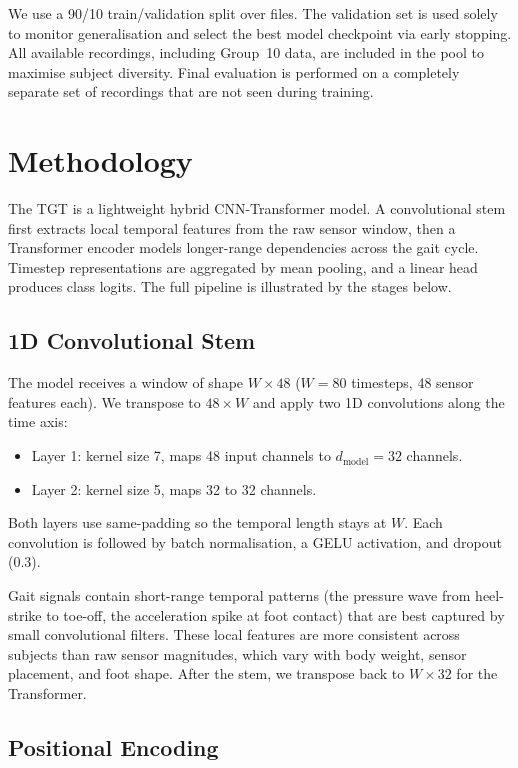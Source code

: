 \documentclass[11pt,a4paper,twocolumn]{article}
\begin{document}
We use a 90/10 train/validation split over files. The validation set is used solely to monitor generalisation and select the best model checkpoint via early stopping. All available recordings, including Group~10 data, are included in the pool to maximise subject diversity. Final evaluation is performed on a completely separate set of recordings that are not seen during training.


\section{Methodology}

The TGT is a lightweight hybrid CNN-Transformer model. A convolutional stem first extracts local temporal features from the raw sensor window, then a Transformer encoder models longer-range dependencies across the gait cycle. Timestep representations are aggregated by mean pooling, and a linear head produces class logits. The full pipeline is illustrated by the stages below.

\subsection{1D Convolutional Stem}

The model receives a window of shape $W \times 48$ ($W = 80$ timesteps, 48 sensor features each). We transpose to $48 \times W$ and apply two 1D convolutions along the time axis:
\begin{itemize}
\item Layer 1: kernel size 7, maps 48 input channels to $d_{\text{model}} = 32$ channels.
\item Layer 2: kernel size 5, maps 32 to 32 channels.
\end{itemize}
Both layers use same-padding so the temporal length stays at $W$. Each convolution is followed by batch normalisation, a GELU activation, and dropout (0.3).

Gait signals contain short-range temporal patterns (the pressure wave from heel-strike to toe-off, the acceleration spike at foot contact) that are best captured by small convolutional filters. These local features are more consistent across subjects than raw sensor magnitudes, which vary with body weight, sensor placement, and foot shape. After the stem, we transpose back to $W \times 32$ for the Transformer.

\subsection{Positional Encoding}
\end{document}

